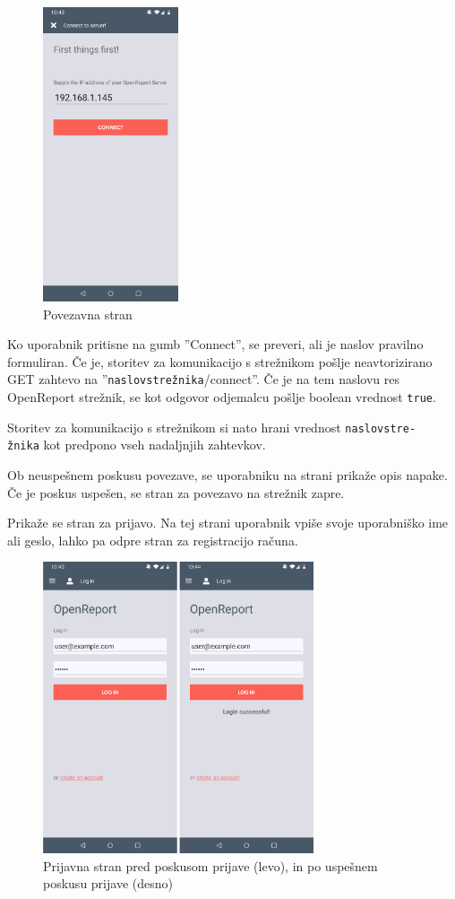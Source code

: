 \documentclass[a4paper, 12pt]{book}
\begin{document}

\begin{figure}[H]
\begin{center}
\includegraphics[width=4cm]{app_connect}
\end{center}
\caption{Povezavna stran}
\label{app_connect}
\end{figure}

Ko uporabnik pritisne na gumb ''Connect'', se preveri, ali je naslov pravilno formuliran.
Če je, storitev za komunikacijo s strežnikom pošlje neavtorizirano GET zahtevo na ''\texttt{naslovstrežnika}/connect''. 
Če je na tem naslovu res OpenReport strežnik, se kot odgovor odjemalcu pošlje boolean vrednost \texttt{true}.

Storitev za komunikacijo s strežnikom si nato hrani vrednost \texttt{naslovstre-\\žnika} kot predpono vseh nadaljnjih zahtevkov.

Ob neuspešnem poskusu povezave, se uporabniku na strani prikaže opis napake.
Če je poskus uspešen, se stran za povezavo na strežnik zapre.

Prikaže se stran za prijavo.
Na tej strani uporabnik vpiše svoje uporabniško ime ali geslo, lahko pa odpre stran za registracijo računa.

\begin{figure}[H]
\begin{center}
\includegraphics[width=8cm]{app_login}
\end{center}
	\caption{Prijavna stran pred poskusom prijave (levo), in po uspešnem poskusu prijave (desno)}
\label{app_login}
\end{figure}
\end{document}
